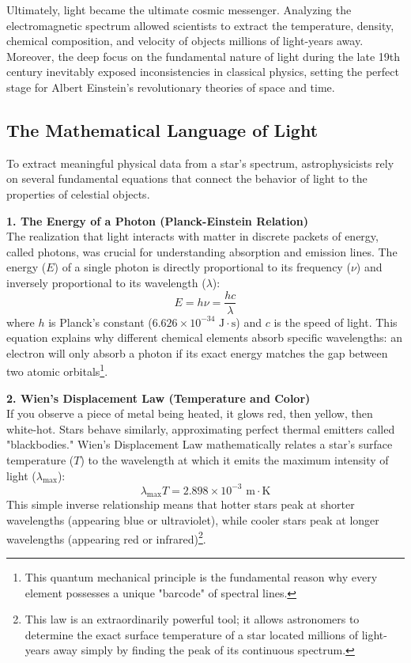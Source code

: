 \documentclass[10pt,a4paper]{article}
\begin{document}
Ultimately, light became the ultimate cosmic messenger. Analyzing the electromagnetic spectrum allowed scientists to extract the temperature, density, chemical composition, and velocity of objects millions of light-years away. Moreover, the deep focus on the fundamental nature of light during the late 19th century inevitably exposed inconsistencies in classical physics, setting the perfect stage for Albert Einstein’s revolutionary theories of space and time.

\subsection{The Mathematical Language of Light}
To extract meaningful physical data from a star's spectrum, astrophysicists rely on several fundamental equations that connect the behavior of light to the properties of celestial objects.

\textbf{1. The Energy of a Photon (Planck-Einstein Relation)} \\
The realization that light interacts with matter in discrete packets of energy, called photons, was crucial for understanding absorption and emission lines. The energy ($E$) of a single photon is directly proportional to its frequency ($\nu$) and inversely proportional to its wavelength ($\lambda$):
$$E = h\nu = \frac{hc}{\lambda}$$
where $h$ is Planck's constant ($6.626 \times 10^{-34} \text{ J}\cdot\text{s}$) and $c$ is the speed of light. This equation explains why different chemical elements absorb specific wavelengths: an electron will only absorb a photon if its exact energy matches the gap between two atomic orbitals\footnote{This quantum mechanical principle is the fundamental reason why every element possesses a unique "barcode" of spectral lines.}.

\textbf{2. Wien's Displacement Law (Temperature and Color)} \\
If you observe a piece of metal being heated, it glows red, then yellow, then white-hot. Stars behave similarly, approximating perfect thermal emitters called "blackbodies." Wien's Displacement Law mathematically relates a star's surface temperature ($T$) to the wavelength at which it emits the maximum intensity of light ($\lambda_{\text{max}}$):
$$\lambda_{\text{max}} T = 2.898 \times 10^{-3} \text{ m}\cdot\text{K}$$
This simple inverse relationship means that hotter stars peak at shorter wavelengths (appearing blue or ultraviolet), while cooler stars peak at longer wavelengths (appearing red or infrared)\footnote{This law is an extraordinarily powerful tool; it allows astronomers to determine the exact surface temperature of a star located millions of light-years away simply by finding the peak of its continuous spectrum.}.
\end{document}
